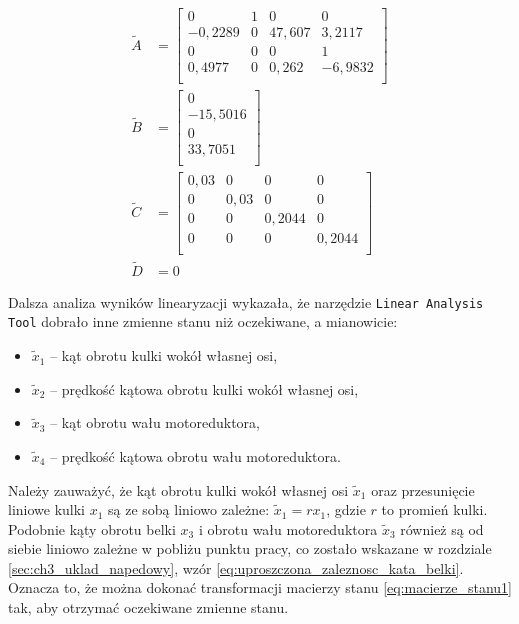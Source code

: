 \begin{align}
    \widetilde{A} &= \begin{bmatrix}
        0 & 1 & 0 & 0 \\
        -0,2289 & 0 & 47,607 & 3,2117 \\
        0 & 0 & 0 & 1 \\
        0,4977 & 0 & 0,262 & -6,9832 \\
    \end{bmatrix} \nonumber \\
    \widetilde{B} &= \begin{bmatrix}
        0 \\
        -15,5016 \\
        0 \\
        33,7051 \\
    \end{bmatrix} \nonumber \\
    \widetilde{C} &= \begin{bmatrix}
            0,03 & 0 & 0 & 0 \\
            0 & 0,03 & 0 & 0 \\
            0 & 0 & 0,2044 & 0 \\
            0 & 0 & 0 & 0,2044 \\
    \end{bmatrix} \nonumber \\
    \widetilde{D} &= 0 \label{eq:macierze_stanu1}
\end{align}

Dalsza analiza wyników linearyzacji wykazała, że narzędzie \texttt{Linear Analysis Tool} dobrało inne zmienne stanu niż oczekiwane, a mianowicie:

\begin{itemize}
    \item $\tilde{x}_1$ -- kąt obrotu kulki wokół własnej osi,
    \item $\tilde{x}_2$ -- prędkość kątowa obrotu kulki wokół własnej osi,
    \item $\tilde{x}_3$ -- kąt obrotu wału motoreduktora,
    \item $\tilde{x}_4$ -- prędkość kątowa obrotu wału motoreduktora.
\end{itemize}

Należy zauważyć, że kąt obrotu kulki wokół własnej osi $\tilde{x}_1$ oraz przesunięcie liniowe kulki $x_1$ są ze sobą liniowo zależne: $\tilde{x}_1 = r x_1$, gdzie $r$ to promień kulki. Podobnie kąty obrotu belki $x_3$ i obrotu wału motoreduktora $\tilde{x}_3$ również są od siebie liniowo zależne w pobliżu punktu pracy, co zostało wskazane w rozdziale \ref{sec:ch3_uklad_napedowy}, wzór \eqref{eq:uproszczona_zaleznosc_kata_belki}. Oznacza to, że można dokonać transformacji macierzy stanu \eqref{eq:macierze_stanu1} tak, aby otrzymać oczekiwane zmienne stanu.

